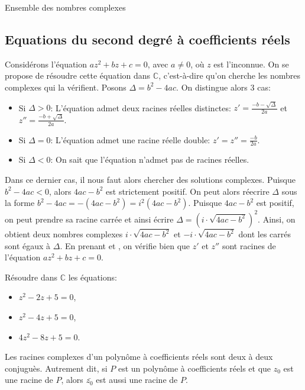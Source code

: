 \begin{chapter}{Ensemble des nombres complexes}
\subsection{Equations du second degr\'e \`a coefficients r\'eels}
%
%
Consid\'erons l'\'equation $a z^2 + b z + c = 0$, avec $a\neq0$, o\`u $z$ est l'inconnue.
On se propose de r\'esoudre cette \'equation dans $\mathbb{C}$, c'est-\`a-dire qu'on cherche les nombres complexes qui la v\'erifient.
Posons $\Delta = b^2 - 4 a c$.
On distingue alors 3 cas:
\begin{itemize}
\item Si $\Delta>0$:
     L'\'equation admet deux racines r\'eelles distinctes: $z' = \frac{-b - \sqrt{\Delta}}{2a}$ et $z'' = \frac{-b + \sqrt{\Delta}}{2a}$.
\item Si $\Delta=0$:
     L'\'equation admet une racine r\'eelle double: $z' = z'' = \frac{-b}{2a}$.
\item Si $\Delta<0$:
     On sait que l'\'equation n'admet pas de racines r\'eelles.
\end{itemize}
Dans ce dernier cas, il nous faut alors chercher des solutions complexes.
Puisque $b^2 - 4 ac<0$, alors $4ac - b^2$ est strictement positif.
On peut alors r\'eecrire $\Delta$ sous la forme $b^2 - 4ac = - (4ac - b^2) = i^2 (4ac - b^2)$.
Puisque $4ac - b^2$ est positif, on peut prendre sa racine carr\'ee et ainsi \'ecrire $\Delta = (i \cdot \sqrt{4ac - b^2} )^2$.
Ainsi, on obtient deux nombres complexes $i \cdot \sqrt{4ac - b^2}$ et $-i \cdot \sqrt{4ac - b^2}$ dont les carr\'es sont \'egaux \`a $\Delta$.
En prenant  et , on v\'erifie bien que $z'$ et $z''$ sont racines de l'\'equation $a z^2 + b z + c = 0$.

\begin{exe}
\label{exe:santatra second degre}
	R\'esoudre dans $\mathbb{C}$ les \'equations:
	\begin{itemize}
	\item $ z^2 - 2 z + 5 = 0 $,
	\item $ z^2 - 4 z + 5 = 0 $,
	\item $ 4 z^2 - 8 z + 5 = 0 $.
	\end{itemize}
\end{exe}
%
\begin{rmk}
      Les racines complexes d'un polyn\^ome \`a coefficients r\'eels sont deux \`a deux conjugu\`es.
      Autrement dit, si $P$ est un polyn\^ome \`a coefficients r\'eels et que $z_0$ est une racine de $P$,
      alors $\bar{z_0}$ est aussi une racine de $P$.
\end{rmk}
%

\end{chapter}
